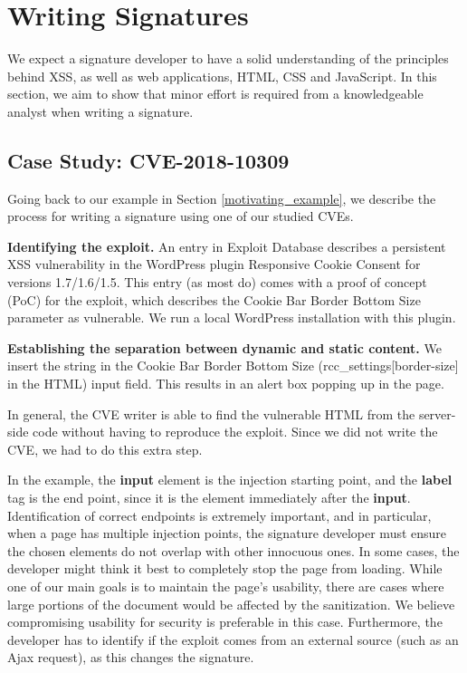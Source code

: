 \section{Writing Signatures} \label{signature_writing}

We expect a signature developer to have a solid understanding of the principles behind \ac{XSS}, as well as web applications, HTML, CSS and JavaScript. In this section, we aim to show that minor effort is required from a knowledgeable analyst when writing a signature.


\subsection{Case Study: CVE-2018-10309} \label{case_study}
Going back to our example in Section \ref{motivating_example}, we describe the process for writing a signature using one of our studied CVEs.  

\textbf{Identifying the exploit.} An entry in Exploit Database \cite{studyCVE} describes a persistent \ac{XSS} vulnerability in the WordPress plugin Responsive Cookie Consent for versions 1.7/1.6/1.5. This entry (as most do) comes with a proof of concept (PoC) for the exploit, which describes the Cookie Bar Border Bottom Size parameter as vulnerable. We run a local WordPress installation with this plugin.

\textbf{Establishing the separation between dynamic and static content.} We insert the string  in the Cookie Bar Border Bottom Size (rcc\_settings[border-size] in the HTML) input field. This results in an alert box popping up in the page.

In general, the CVE writer is able to find the vulnerable HTML from the server-side code without having to reproduce the exploit. Since we did not write the CVE, we had to do this extra step.

In the example, the \textbf{input} element is the injection starting point, and the \textbf{label} tag is the end point, since it is the element immediately after the \textbf{input}. Identification of correct endpoints is extremely important, and in particular, when a page has multiple injection points, the signature developer must ensure the chosen elements do not overlap with other innocuous ones. In some cases, the developer might think it best to completely stop the page from loading. While one of our main goals is to maintain the page’s usability, there are cases where large portions of the document would be affected by the sanitization. We believe compromising usability for security is preferable in this case. Furthermore, the developer has to identify if the exploit comes from an external source (such as an Ajax request), as this changes the signature.

